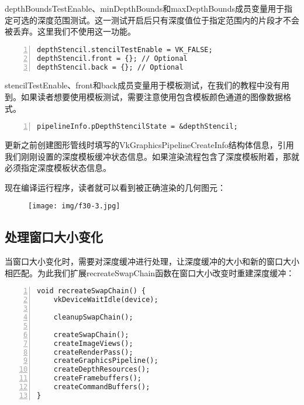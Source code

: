 \documentclass{ctexart}
\begin{document}
depthBoundsTestEnable、minDepthBounds和maxDepthBounds成员变量用于指定可选的深度范围测试。这一测试开启后只有深度值位于指定范围内的片段才不会被丢弃。这里我们不使用这一功能。

\begin{lstlisting}[language={[ANSI]C},keywordstyle=\color{blue!70},commentstyle=\color{red!50!green!50!blue!50},frame=shadowbox, rulesepcolor=\color{red!20!green!20!blue!20},basicstyle=\small,numbers=left, numberstyle=\tiny,breaklines=true]
depthStencil.stencilTestEnable = VK_FALSE;
depthStencil.front = {}; // Optional
depthStencil.back = {}; // Optional
\end{lstlisting}

stencilTestEnable、front和back成员变量用于模板测试，在我们的教程中没有用到。如果读者想要使用模板测试，需要注意使用包含模板颜色通道的图像数据格式。

\begin{lstlisting}[language={[ANSI]C},keywordstyle=\color{blue!70},commentstyle=\color{red!50!green!50!blue!50},frame=shadowbox, rulesepcolor=\color{red!20!green!20!blue!20},basicstyle=\small,numbers=left, numberstyle=\tiny,breaklines=true]
pipelineInfo.pDepthStencilState = &depthStencil;
\end{lstlisting}

更新之前创建图形管线时填写的VkGraphicsPipelineCreateInfo结构体信息，引用我们刚刚设置的深度模板缓冲状态信息。如果渲染流程包含了深度模板附着，那就必须指定深度模板状态信息。

现在编译运行程序，读者就可以看到被正确渲染的几何图元：

\begin{figure}[H]
	\centering
	\texttt{[image: img/f30-3.jpg]}
\end{figure}

\subsection{处理窗口大小变化}

当窗口大小变化时，需要对深度缓冲进行处理，让深度缓冲的大小和新的窗口大小相匹配。为此我们扩展recreateSwapChain函数在窗口大小改变时重建深度缓冲：

\begin{lstlisting}[language={[ANSI]C},keywordstyle=\color{blue!70},commentstyle=\color{red!50!green!50!blue!50},frame=shadowbox, rulesepcolor=\color{red!20!green!20!blue!20},basicstyle=\small,numbers=left, numberstyle=\tiny,breaklines=true]
void recreateSwapChain() {
	vkDeviceWaitIdle(device);

	cleanupSwapChain();

	createSwapChain();
	createImageViews();
	createRenderPass();
	createGraphicsPipeline();
	createDepthResources();
	createFramebuffers();
	createCommandBuffers();
}
\end{lstlisting}
\end{document}
